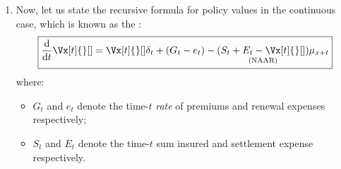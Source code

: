 \begin{enumerate}
\item \label{it:thieles-diffeq} Now, let us state the recursive formula for
policy values in the continuous case, which is known as the :
\[
\boxed{\dv{}{t}\Vx[t]{}[]=\Vx[t]{}[]\delta_t+(G_t-e_t)
-\underset{\text{(NAAR)}}{(S_t+E_t-\Vx[t]{}[])}\mu_{x+t}}
\]
where:
\begin{itemize}
\item \(G_t\) and \(e_t\) denote the time-\(t\) \emph{rate} of premiums and
renewal expenses respectively;
\item \(S_t\) and \(E_t\) denote the time-\(t\) sum insured and settlement
expense respectively.
\end{itemize}


\end{enumerate}
